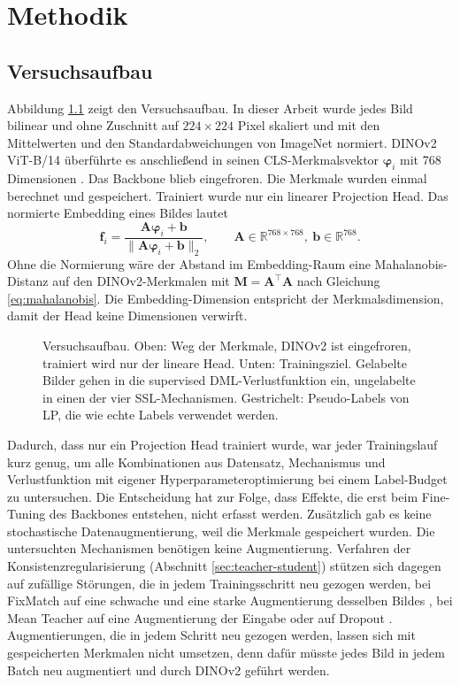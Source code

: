 \chapter{Methodik}
\label{chap:methodik}

\section{Versuchsaufbau}
\label{sec:aufbau}

Abbildung \ref{fig:pipeline} zeigt den Versuchsaufbau. In dieser Arbeit wurde jedes Bild bilinear und ohne Zuschnitt auf $224\times224$ Pixel skaliert und mit den Mittelwerten und den Standardabweichungen von ImageNet normiert. DINOv2 ViT-B/14 überführte es anschließend in seinen \ac{CLS}-Merkmalsvektor $\bm{\varphi}_i$ mit 768 Dimensionen \cite{oquab_dinov2_2023}. Das Backbone blieb eingefroren. Die Merkmale wurden einmal berechnet und gespeichert. Trainiert wurde nur ein linearer Projection Head. Das normierte Embedding eines Bildes lautet
\begin{equation}
  \bm{f}_i=\frac{\bm{A}\bm{\varphi}_i+\bm{b}}{\lVert\bm{A}\bm{\varphi}_i+\bm{b}\rVert_2},\qquad \bm{A}\in\mathbb{R}^{768\times768},\ \bm{b}\in\mathbb{R}^{768}.
  \label{eq:kopf}
\end{equation}
Ohne die Normierung wäre der Abstand im Embedding-Raum eine Mahalanobis-Distanz auf den DINOv2-Merkmalen mit $\bm{M}=\bm{A}^{\top}\bm{A}$ nach Gleichung \eqref{eq:mahalanobis}. Die Embedding-Dimension entspricht der Merkmalsdimension, damit der Head keine Dimensionen verwirft.

\begin{figure}[tbp]
  \centering
  
  \caption[Versuchsaufbau]{Versuchsaufbau. Oben: Weg der Merkmale, DINOv2 ist eingefroren, trainiert wird nur der lineare Head. Unten: Trainingsziel. Gelabelte Bilder gehen in die supervised \acs{DML}-Verlustfunktion ein, ungelabelte in einen der vier \acs{SSL}-Mechanismen. Gestrichelt: Pseudo-Labels von \acs{LP}, die wie echte Labels verwendet werden.}
  \label{fig:pipeline}
\end{figure}

Dadurch, dass nur ein Projection Head trainiert wurde, war jeder Trainingslauf kurz genug, um alle Kombinationen aus Datensatz, Mechanismus und Verlustfunktion mit eigener Hyperparameteroptimierung bei einem Label-Budget zu untersuchen. Die Entscheidung hat zur Folge, dass Effekte, die erst beim Fine-Tuning des Backbones entstehen, nicht erfasst werden. Zusätzlich gab es keine stochastische Datenaugmentierung, weil die Merkmale gespeichert wurden. Die untersuchten Mechanismen benötigen keine Augmentierung. Verfahren der Konsistenzregularisierung (Abschnitt \ref{sec:teacher-student}) stützen sich dagegen auf zufällige Störungen, die in jedem Trainingsschritt neu gezogen werden, bei FixMatch auf eine schwache und eine starke Augmentierung desselben Bildes \cite{sohn_fixmatch_2020}, bei Mean Teacher auf eine Augmentierung der Eingabe oder auf Dropout \cite{tarvainen_weight-averaged_2017}. Augmentierungen, die in jedem Schritt neu gezogen werden, lassen sich mit gespeicherten Merkmalen nicht umsetzen, denn dafür müsste jedes Bild in jedem Batch neu augmentiert und durch DINOv2 geführt werden. 

